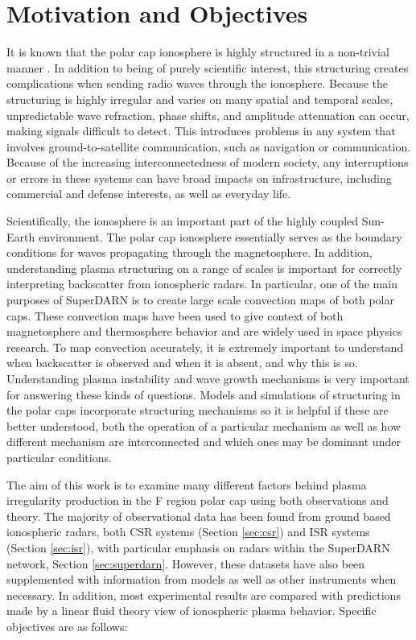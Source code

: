 \section{Motivation and Objectives}

It is known that the polar cap ionosphere is highly structured in a non-trivial manner \citep{Carlson2012}.  In addition to being of purely scientific interest, this structuring creates complications when sending radio waves through the ionosphere.  Because the structuring is highly irregular and varies on many spatial and temporal scales, unpredictable wave refraction, phase shifts, and amplitude attenuation can occur, making signals difficult to detect.  This introduces problems in any system that involves ground-to-satellite communication, such as navigation or communication.  Because of the increasing interconnectedness of modern society, any interruptions or errors in these systems can have broad impacts on infrastructure, including commercial and defense interests, as well as everyday life.

Scientifically, the ionosphere is an important part of the highly coupled Sun-Earth environment.  The polar cap ionosphere essentially serves as the boundary conditions for waves propagating through the magnetosphere.  In addition, understanding plasma structuring on a range of scales is important for correctly interpreting backscatter from ionospheric radars.  In particular, one of the main purposes of SuperDARN is to create large scale convection maps of both polar caps.  These convection maps have been used to give context of both magnetosphere and thermosphere behavior and are widely used in space physics research.  To map convection accurately, it is extremely important to understand when backscatter is observed and when it is absent, and why this is so.  Understanding plasma instability and wave growth mechanisms is very important for answering these kinds of questions.  Models and simulations of structuring in the polar caps incorporate structuring mechanisms so it is helpful if these are better understood, both the operation of a particular mechanism as well as how different mechanism are interconnected and which ones may be dominant under particular conditions.

The aim of this work is to examine many different factors behind plasma irregularity production in the F region polar cap using both observations and theory.  The majority of observational data has been found from ground based ionospheric radars, both CSR systems (Section \ref{sec:csr}) and ISR systems (Section \ref{sec:isr}), with particular emphasis on radars within the SuperDARN network, Section \ref{sec:superdarn}.  However, these datasets have also been supplemented with information from models as well as other instruments when necessary.  In addition, most experimental results are compared with predictions made by a linear fluid theory view of ionospheric plasma behavior.  Specific objectives are as follows:

